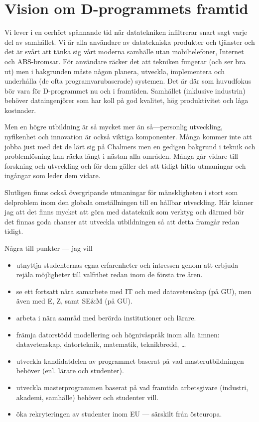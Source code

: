 \section{Vision om D-programmets framtid}


Vi lever i en oerhört spännande tid när datatekniken infiltrerar
snart sagt varje del av samhället.
%
Vi är alla användare av datatekniska produkter och tjänster och det
är svårt att tänka sig vårt moderna samhälle utan mobiltelefoner,
Internet och ABS-bromsar.
%
För användare räcker det att tekniken fungerar (och ser bra ut) men i
bakgrunden måste någon planera, utveckla, implementera och underhålla
(de ofta programvarubaserade) systemen.
%
Det är där som huvudfokus bör vara för D-programmet nu och i framtiden. 
%
Samhället (inklusive industrin) behöver dataingenjörer som har koll på
god kvalitet, hög produktivitet och låga kostnader.
%

Men en högre utbildning är så mycket mer än så---personlig utveckling,
nyfikenhet och innovation är också viktiga komponenter.
%
Många kommer inte att jobba just med det de lärt sig på Chalmers men
en gedigen bakgrund i teknik och problemlösning kan räcka långt i
nästan alla områden.
%
Många går vidare till forskning och utveckling och för dem gäller det
att tidigt hitta utmaningar och ingångar som leder dem vidare.

Slutligen finns också övergripande utmaningar för mänskligheten i stort
som delproblem inom den globala omställningen till en hållbar
utveckling.
%
Här känner jag att det finns mycket att göra med datateknik som
verktyg och därmed bör det finnas goda chanser att utveckla
utbildningen så att detta framgår redan tidigt. 
%

Några till punkter --- jag vill
\begin{itemize}
\item utnyttja studenternas egna erfarenheter och intressen genom att
  erbjuda rejäla möjligheter till valfrihet redan inom de första tre
  åren.
\item se ett fortsatt nära samarbete med IT och med datavetenskap (på
  GU), men även med E, Z, samt SE\&M (på GU).
\item arbeta i nära samråd med berörda institutioner och lärare.
\item främja datorstödd modellering och högnivåspråk inom alla ämnen:
  datavetenskap, datorteknik, mate\-matik, teknikbredd, \ldots
\item utveckla kandidatdelen av programmet baserat på vad
  masterutbildningen behöver (enl. lärare och studenter).
\item utveckla masterprogrammen baserat på vad framtida arbetsgivare
  (industri, akademi, samhälle) behöver och studenter vill.
\item öka rekryteringen av studenter inom EU --- särskilt från
  östeuropa.
\end{itemize}
